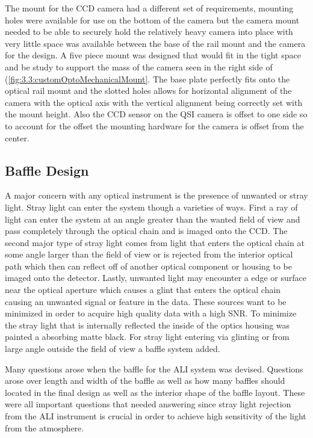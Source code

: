 The mount for the CCD camera had a different set of requirements, mounting holes were available for use on the bottom of the camera but the camera mount needed to be able to securely hold the relatively heavy camera into place with very little space was available between the base of the rail mount and the camera for the design. A five piece mount was designed that would fit in the tight space and be study to support the mass of the camera seen in the right side of (\autoref{fig:3.3:customOptoMechanicalMount}. The base plate perfectly fits onto the optical rail mount and the slotted holes allows for horizontal alignment of the camera with the optical axis with the vertical alignment being correctly set with the mount height. Also the CCD sensor on the QSI camera is offset to one side so to account for the offset the mounting hardware for the camera is offset from the center.


\subsection{Baffle Design}

A major concern with any optical instrument is the presence of unwanted or stray light. Stray light can enter the system though a varieties of ways. First a ray of light can enter the system at an angle greater than the wanted field of view and pass completely through the optical chain and is imaged onto the CCD. The second major type of stray light comes from light that enters the optical chain at some angle larger than the field of view or is rejected from the interior optical path which then can reflect off of another optical component or housing to be imaged onto the detector. Lastly, unwanted light may encounter a edge or surface near the optical aperture which causes a glint that enters the optical chain causing an unwanted signal or feature in the data. These sources want to be minimized in order to acquire high quality data with a high SNR. To minimize the stray light that is internally reflected the inside of the optics housing was painted a absorbing matte black. For stray light entering via glinting or from large angle outside the field of view a baffle system added.

Many questions arose when the baffle for the ALI system was devised. Questions arose over length and width of the baffle as well as how many baffles should located in the final design as well as the interior shape of the baffle layout. These were all important questions that needed answering since stray light rejection from the ALI instrument is crucial in order to achieve high sensitivity of the light from the atmosphere.

